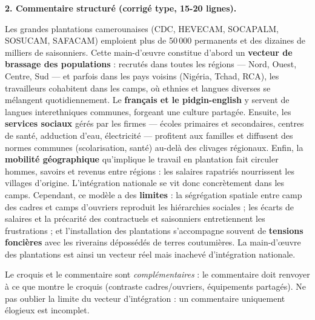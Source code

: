 \documentclass[11pt]{article}
\begin{document}
\begin{corrige}
\textbf{2. Commentaire structuré (corrigé type, 15-20 lignes).}

Les grandes plantations camerounaises (CDC, HEVECAM, SOCAPALM, SOSUCAM, SAFACAM) emploient plus de 50\,000 permanents et des dizaines de milliers de saisonniers. Cette main-d'œuvre constitue d'abord un \textbf{vecteur de brassage des populations} : recrutés dans toutes les régions — Nord, Ouest, Centre, Sud — et parfois dans les pays voisins (Nigéria, Tchad, RCA), les travailleurs cohabitent dans les camps, où ethnies et langues diverses se mélangent quotidiennement. Le \textbf{français et le pidgin-english} y servent de langues interethniques communes, forgeant une culture partagée. Ensuite, les \textbf{services sociaux} gérés par les firmes — écoles primaires et secondaires, centres de santé, adduction d'eau, électricité — profitent aux familles et diffusent des normes communes (scolarisation, santé) au-delà des clivages régionaux. Enfin, la \textbf{mobilité géographique} qu'implique le travail en plantation fait circuler hommes, savoirs et revenus entre régions : les salaires rapatriés nourrissent les villages d'origine. L'intégration nationale se vit donc concrètement dans les camps. Cependant, ce modèle a des \textbf{limites} : la ségrégation spatiale entre camp des cadres et camps d'ouvriers reproduit les hiérarchies sociales ; les écarts de salaires et la précarité des contractuels et saisonniers entretiennent les frustrations ; et l'installation des plantations s'accompagne souvent de \textbf{tensions foncières} avec les riverains dépossédés de terres coutumières. La main-d'œuvre des plantations est ainsi un vecteur réel mais inachevé d'intégration nationale.
\end{corrige}

\begin{attention}
Le croquis et le commentaire sont \emph{complémentaires} : le commentaire doit renvoyer à ce que montre le croquis (contraste cadres/ouvriers, équipements partagés). Ne pas oublier la \og limite \fg{} du vecteur d'intégration : un commentaire uniquement élogieux est incomplet.
\end{attention}
\end{document}
